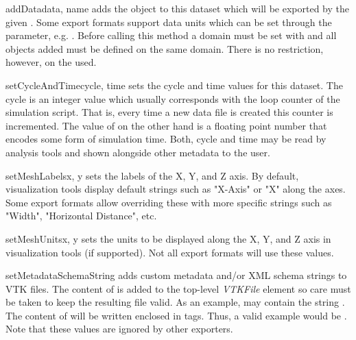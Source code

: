 \begin{methoddesc}[EscriptDataset]{addData}{data, name }
    adds the \Data object  to this dataset which will be exported by
    the given . Some export formats support data units which can be
    set through the  parameter, e.g. .
    Before calling this method a domain must be set with 
    and all \Data objects added must be defined on the same domain.
    There is no restriction, however, on the \FunctionSpace used.
\end{methoddesc}

\begin{methoddesc}[EscriptDataset]{setCycleAndTime}{cycle, time}
    sets the cycle and time values for this dataset.
    The cycle is an integer value which usually corresponds with the loop
    counter of the simulation script. That is, every time a new data file is
    created this counter is incremented.
    The value of  on the other hand is a floating point number that
    encodes some form of simulation time.
    Both, cycle and time may be read by analysis tools and shown alongside
    other metadata to the user.
\end{methoddesc}

\begin{methoddesc}[EscriptDataset]{setMeshLabels}{x, y }
    sets the labels of the X, Y, and Z axis. By default, visualization tools
    display default strings such as "X-Axis" or "X" along the axes. Some export
    formats allow overriding these with more specific strings such as "Width",
    "Horizontal Distance", etc.
\end{methoddesc}

\begin{methoddesc}[EscriptDataset]{setMeshUnits}{x, y }
    sets the units to be displayed along the X, Y, and Z axis in visualization
    tools (if supported). Not all export formats will use these values.
\end{methoddesc}

\begin{methoddesc}[EscriptDataset]{setMetadataSchemaString}{}
    adds custom metadata and/or XML schema strings to VTK files.
    The content of  is added to the top-level \emph{VTKFile}
    element so care must be taken to keep the resulting file valid.
    As an example,  may contain the string
    . The content of 
    will be written enclosed in  tags. Thus, a valid example
    would be .
    Note that these values are ignored by other exporters.
\end{methoddesc}

